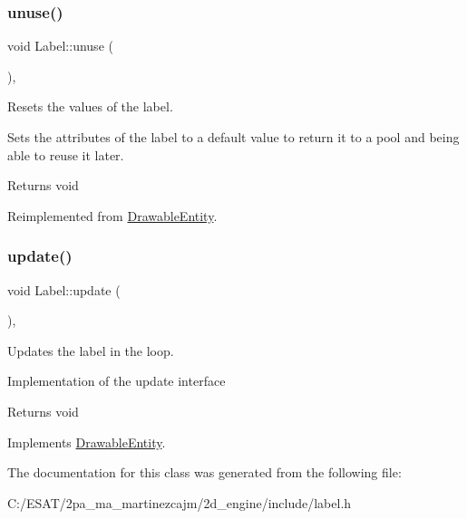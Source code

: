 \subsubsection{\texorpdfstring{unuse()}{unuse()}}
{\footnotesize\ttfamily void Label\+::unuse (\begin{DoxyParamCaption}{ }\end{DoxyParamCaption})\hspace{0.3cm}{\ttfamily [override]}, {\ttfamily [virtual]}}



Resets the values of the label. 

Sets the attributes of the label to a default value to return it to a pool and being able to reuse it later.

\begin{DoxyReturn}{Returns}
void 
\end{DoxyReturn}


Reimplemented from \hyperlink{class_drawable_entity_aabea8715834f6cee7fd36b038d1a4843}{Drawable\+Entity}.

\mbox{\label{class_label_adcd154f9e53d277c1b7a11bd058936a0}} 
\subsubsection{\texorpdfstring{update()}{update()}}
{\footnotesize\ttfamily void Label\+::update (\begin{DoxyParamCaption}{ }\end{DoxyParamCaption})\hspace{0.3cm}{\ttfamily [override]}, {\ttfamily [virtual]}}



Updates the label in the loop. 

Implementation of the update interface

\begin{DoxyReturn}{Returns}
void 
\end{DoxyReturn}


Implements \hyperlink{class_drawable_entity_acbf8317de062a2e0e79f646dbe75249c}{Drawable\+Entity}.



The documentation for this class was generated from the following file\+:\begin{DoxyCompactItemize}
\item 
C\+:/\+E\+S\+A\+T/2pa\+\_\+ma\+\_\+martinezcajm/2d\+\_\+engine/include/label.\+h\end{DoxyCompactItemize}

